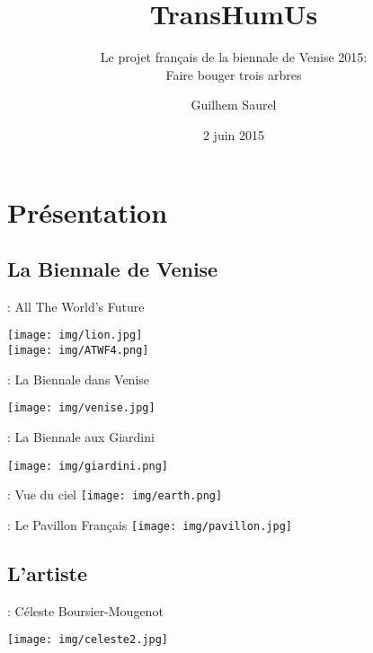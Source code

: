 \documentclass[12pt]{beamer}
\title{TransHumUs}
\subtitle{Le projet français de la biennale de Venise 2015: \\Faire bouger trois arbres}
\author{Guilhem Saurel}
\institute{Gepetto}
\date{2 juin 2015}
\begin{document}
    {\canvasspecial
    \begin{frame}
    \titlepage
    \end{frame}}

    \section{Présentation}
        \subsection{La Biennale de Venise}
            \begin{frame}{\subsecname: All The World’s Future}
                \begin{center}
                    \texttt{[image: img/lion.jpg]} \\
                    \texttt{[image: img/ATWF4.png]}
                \end{center}
            \end{frame}
            \begin{frame}{\subsecname: La Biennale dans Venise}
                \vspace{-0.4cm}
                \begin{center}
                    \texttt{[image: img/venise.jpg]}
                \end{center}
            \end{frame}
            \begin{frame}{\subsecname: La Biennale aux Giardini}
                \vspace{-0.4cm}
                \begin{center}
                    \texttt{[image: img/giardini.png]}
                \end{center}
            \end{frame}
            \begin{frame}{\subsecname: Vue du ciel}
                \texttt{[image: img/earth.png]}
            \end{frame}
            \begin{frame}{\subsecname: Le Pavillon Français}
                \texttt{[image: img/pavillon.jpg]}
            \end{frame}

        \subsection{L’artiste}
            \begin{frame}{\subsecname: Céleste Boursier-Mougenot}
                \vspace{-0.4cm}
                \begin{center}
                    \texttt{[image: img/celeste2.jpg]}
                \end{center}
            \end{frame}
\end{document}
